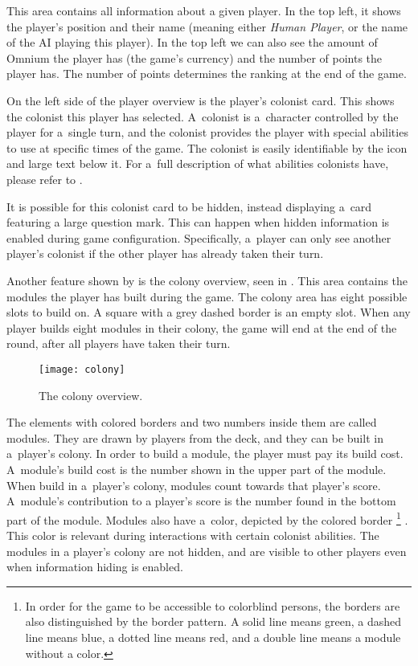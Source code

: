 This area contains all information about a given player. In the top left,
it shows the player's position and their name (meaning either \emph{Human Player},
or the name of the AI playing this player). In the top left we can also see
the amount of Omnium the player has (the game's currency) and the number of points
the player has. The number of points determines the ranking at the end of the game.

On the left side of the player overview is the player's colonist card. This shows
the colonist this player has selected. A~colonist is a~character controlled
by the player for a~single turn, and the colonist provides the player with
special abilities to use at specific times of the game. The colonist is
easily identifiable by the icon and large text below it. For a~full description
of what abilities colonists have, please refer to .

It is possible for this colonist card to be hidden, instead displaying a~card
featuring a large question mark. This can happen when hidden information is enabled
during game configuration. Specifically, a~player can only see another player's
colonist if the other player has already taken their turn.

Another feature shown by  is the colony overview, seen in
. This area contains the modules the player has built during
the game. The colony area has eight possible slots to build on. A square with
a grey dashed border is an empty slot. When any player
builds eight modules in their colony, the game will end at the end of the round,
after all players have taken their turn.

\begin{figure}[ht]
\centerline{\mbox{\texttt{[image: colony]}}}
\caption{The colony overview.}\label{ud:colony}
\end{figure}

The elements with colored borders and two numbers inside them are called modules.
They are drawn by players from the deck, and they can be built in a~player's colony.
In order to build a module, the player must pay its build cost. A~module's build cost
is the number shown in the upper part of the module. When build in a~player's colony,
modules count towards that player's score. A~module's contribution to a player's
score is the number found in the bottom part of the module. Modules also have
a~color, depicted by the colored border \footnote{In order for the game to be accessible
to colorblind persons, the borders are also distinguished by the border pattern. A solid
line means green, a dashed line means blue, a dotted line means red, and a double line means
a module without a color.}
. This color is relevant during interactions
with certain colonist abilities. The modules in a player's colony are not hidden, and
are visible to other players even when information hiding is enabled.

